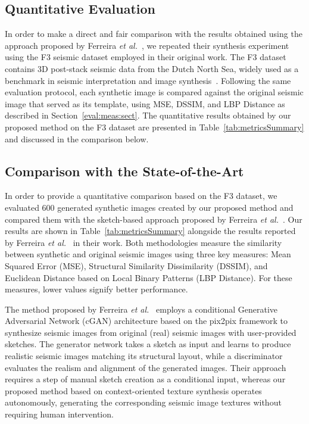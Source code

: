 \documentclass{ieeeaccess}
\begin{document}
\subsection{Quantitative Evaluation}

In order to make a direct and fair comparison with the results obtained using the approach proposed by Ferreira \emph{et al.}~\cite{Ferreira2020}, we repeated their synthesis experiment using the F3 seismic dataset employed in their original work. The F3 dataset contains 3D post-stack seismic data from the Dutch North Sea, widely used as a benchmark in seismic interpretation and image synthesis~\cite{Baroni2018}. Following the same evaluation protocol, each synthetic image is compared against the original seismic image that served as its template, using MSE, DSSIM, and LBP Distance as described in Section~\ref{eval:meas:sect}. The quantitative results obtained by our proposed method on the F3 dataset are presented in Table~\ref{tab:metricsSummary} and discussed in the comparison below.


\subsection{Comparison with the State-of-the-Art}

In order to provide a quantitative comparison based on the F3 dataset, we evaluated 600 generated synthetic images created by our proposed method and compared them with the sketch-based approach proposed by Ferreira \emph{et al.}~\cite{Ferreira2020}. Our results are shown in Table~\ref{tab:metricsSummary} alongside the results reported by Ferreira \emph{et al.}~\cite{Ferreira2020} in their work. Both methodologies measure the similarity between synthetic and original seismic images using three key measures: Mean Squared Error (MSE), Structural Similarity Dissimilarity (DSSIM), and Euclidean Distance based on Local Binary Patterns (LBP Distance). For these measures, lower values signify better performance.

The method proposed by Ferreira \emph{et al.}~\cite{Ferreira2020} employs a conditional Generative Adversarial Network (cGAN) architecture based on the pix2pix framework to synthesize seismic images from original (real) seismic images with user-provided sketches. The generator network takes a sketch as input and learns to produce realistic seismic images matching its structural layout, while a discriminator evaluates the realism and alignment of the generated images. Their approach requires a step of manual sketch creation as a conditional input, whereas our proposed method based on  context-oriented texture synthesis operates autonomously, generating the corresponding seismic image textures without requiring human intervention.
\end{document}
